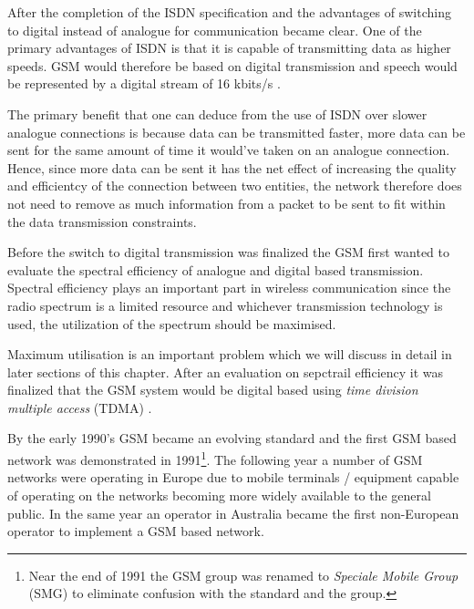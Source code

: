 After the completion of the ISDN specification and the advantages of switching to digital instead of analogue for communication became clear. One of the primary advantages of ISDN is that it is capable of transmitting data as higher speeds. GSM would therefore be based on digital transmission and speech would be represented by a digital stream of 16 kbits/s \cite{GSM92}.

The primary benefit that one can deduce from the use of ISDN over slower analogue connections is because data can be transmitted faster, more data can be sent for the same amount of time it would've taken on an analogue connection. Hence, since more data can be sent it has the net effect of increasing the quality and efficientcy of the connection between two entities, the network therefore does not need to remove as much information from a packet to be sent to fit within the data transmission constraints.

Before the switch to digital transmission was finalized the GSM first wanted to evaluate the spectral efficiency of analogue and digital based transmission. Spectral efficiency plays an important part in wireless communication since the radio spectrum is a limited resource and whichever transmission technology is used, the utilization of the spectrum should be maximised. 

Maximum utilisation is an important problem which we will discuss in detail in later sections of this chapter. After an evaluation on sepctrail efficiency it was finalized that the GSM system would be digital based using \emph{time division multiple access} (TDMA) \cite{GSM92,GSMSysEngin}.

By the early 1990’s GSM became an evolving standard and the first GSM based network was demonstrated in 1991\footnote{Near the end of 1991 the GSM group was renamed to \emph{Speciale Mobile Group} (SMG) to eliminate confusion with the standard and the group.}. The following year a number of GSM networks were operating in Europe due to mobile terminals / equipment capable of operating on the networks becoming more widely available to the general public. In the same year an operator in Australia became the first non-European operator to implement a GSM based network\cite{Eisenblatter}.

